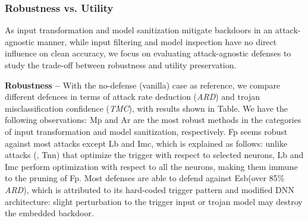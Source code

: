 \documentclass[compsoc,conference,a4paper,10pt,times]{IEEEtran}
\newcommand{\tnn}{{\sc Tnn}\xspace}
\newcommand{\lb}{{\sc Lb}\xspace}
\newcommand{\esb}{{\sc Esb}\xspace}
\newcommand{\imc}{{\sc Imc}\xspace}
\newcommand{\tmc}{{\em \small TMC}\xspace}
\newcommand{\ard}{{\em \small ARD}\xspace}
\newcommand{\fp}{{\sc Fp}\xspace}
\newcommand{\at}{{\sc Ar}\xspace}
\newcommand{\mmp}{{\sc Mp}\xspace}
\begin{document}
\subsubsection{Robustness vs. Utility}

As input transformation and model sanitization mitigate backdoors in an attack-agnostic manner, while input filtering and model inspection have no direct influence on clean accuracy, we focus on evaluating attack-agnostic defenses to study the trade-off between robustness and utility preservation.

\vspace{2pt}
{\bf Robustness --} With the no-defense (vanilla) case as reference, we compare different defences in terms of attack rate deduction (\ard) and trojan misclassification confidence (\tmc), with results shown in Table. We have the following observations:  \mmp and \at are the most robust methods in the categories of input transformation and model sanitization, respectively.  
\fp seems robust against most attacks except \lb and \imc, which is explained as follows: unlike attacks (\meg, \tnn) that optimize the trigger with respect to selected neurons, \lb and \imc perform optimization with respect to all the neurons,  making them immune to the pruning of \fp. 
 Most defenses are able to defend against \esb (over 85\% \ard), which is attributed to its hard-coded trigger pattern and modified DNN architecture: slight perturbation to the trigger input or trojan model may destroy the embedded backdoor. 
\end{document}
